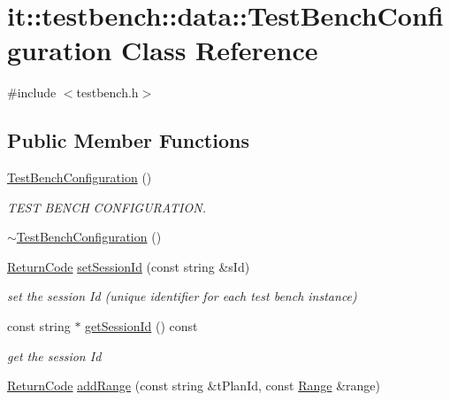 \hypertarget{classit_1_1testbench_1_1data_1_1TestBenchConfiguration}{\section{it\-:\-:testbench\-:\-:data\-:\-:Test\-Bench\-Configuration Class Reference}
\label{d5/daa/classit_1_1testbench_1_1data_1_1TestBenchConfiguration}
}


{\ttfamily \#include $<$testbench.\-h$>$}

\subsection*{Public Member Functions}
\begin{DoxyCompactItemize}
\item 
\hyperlink{classit_1_1testbench_1_1data_1_1TestBenchConfiguration_a1ade0e983ed866a1de6e2d3310243f98}{Test\-Bench\-Configuration} ()
\begin{DoxyCompactList}\small\item\em T\-E\-S\-T B\-E\-N\-C\-H C\-O\-N\-F\-I\-G\-U\-R\-A\-T\-I\-O\-N. \end{DoxyCompactList}\item 
\hyperlink{classit_1_1testbench_1_1data_1_1TestBenchConfiguration_a4e9f41097f2e6a334286ae28b5b063f3}{$\sim$\-Test\-Bench\-Configuration} ()
\item 
\hyperlink{structit_1_1testbench_1_1data_1_1ReturnCode}{Return\-Code} \hyperlink{classit_1_1testbench_1_1data_1_1TestBenchConfiguration_a488898686d82f03522370ae00e1be29c}{set\-Session\-Id} (const string \&s\-Id)
\begin{DoxyCompactList}\small\item\em set the session Id (unique identifier for each test bench instance) \end{DoxyCompactList}\item 
const string $\ast$ \hyperlink{classit_1_1testbench_1_1data_1_1TestBenchConfiguration_a1bc7e49a069546d3ed715fef92dfefa8}{get\-Session\-Id} () const 
\begin{DoxyCompactList}\small\item\em get the session Id \end{DoxyCompactList}\item 
\hyperlink{structit_1_1testbench_1_1data_1_1ReturnCode}{Return\-Code} \hyperlink{classit_1_1testbench_1_1data_1_1TestBenchConfiguration_ae6ff47a0bf383c07c7ea255932805bae}{add\-Range} (const string \&t\-Plan\-Id, const \hyperlink{structit_1_1testbench_1_1data_1_1Range}{Range} \&range)

\end{DoxyCompactItemize}
